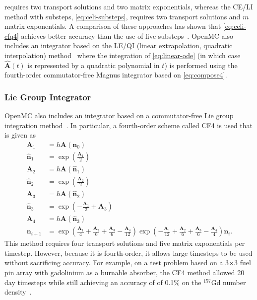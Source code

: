 \documentclass[3p,authoryear]{elsarticle}
\newcommand{\vect}[1]{\mathbf{#1}} %
\begin{document}
 requires two transport solutions and two matrix
exponentials, whereas the CE/LI method with substeps, \cref{eq:celi-substeps},
requires two transport solutions and $m$ matrix exponentials. A comparison of
these approaches has shown that \cref{eq:celi-cfq4} achieves better accuracy
than the use of five substeps~\citep{josey2017phd}. OpenMC also includes an
integrator based on the LE/QI (linear extrapolation, quadratic interpolation)
method~\citep{isotalo2011ane2} where the integration of \cref{eq:linear-ode} (in
which case $\hat{\vect{A}}(t)$ is represented by a quadratic polynomial in $t$)
is performed using the fourth-order commutator-free Magnus integrator based on
\cref{eq:compose4}.

\subsubsection{Lie Group Integrator}

OpenMC also includes an integrator based on a commutator-free Lie group
integration method~\citep{celledoni2004fgcs}. In particular, a fourth-order
scheme called CF4 is used that is given as
\begin{equation}
  \begin{split}
    \vect{A}_1 &= h\vect{A}(\vect{n}_0) \\
    \hat{\vect{n}}_1 &= \exp \left ( \frac{\vect{A}_1}{2} \right ) \\
    \vect{A}_2 &= h\vect{A}(\hat{\vect{n}}_1) \\
    \hat{\vect{n}}_2 &= \exp \left ( \frac{\vect{A}_2}{2} \right ) \\
    \vect{A}_3 &= h \vect{A}(\hat{\vect{n}}_2) \\
    \hat{\vect{n}}_3 &= \exp \left ( -\frac{\vect{A}_1}{2}  + \vect{A}_3 \right ) \\
    \vect{A}_4 &= h\vect{A}(\hat{\vect{n}}_3) \\
    \vect{n}_{i+1} &= \exp \left ( \frac{\vect{A}_1}{4} + \frac{\vect{A}_2}{6} + \frac{\vect{A}_3}{6} - \frac{\vect{A}_4}{12} \right )
    \exp \left ( -\frac{\vect{A}_1}{12} + \frac{\vect{A}_2}{6} + \frac{\vect{A}_3}{6} - \frac{\vect{A}_4}{4} \right ) \vect{n}_i.
  \end{split}
\end{equation}
This method requires four transport solutions and five matrix exponentials per
timestep. However, because it is fourth-order, it allows large timesteps to be
used without sacrificing accuracy. For example, on a test problem based on a
3$\times$3 fuel pin array with gadolinium as a burnable absorber, the CF4 method
allowed 20 day timesteps while still achieving an accuracy of of 0.1\% on the
$^{157}$Gd number density~\citep{josey2017phd}.
\end{document}
